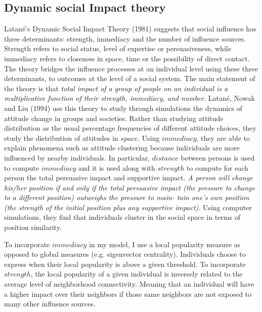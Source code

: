 \documentclass{article}
\begin{document}
\subsection{Dynamic social Impact theory}

Latan\'{e}'s Dynamic Social Impact Theory (1981)\cite{latane81} suggests that social influence has three determinants: strength, immediacy and the number of influence sources. Strength refers to social status, level of expertise or persuasiveness, while immediacy refers to closeness in space, time or the possibility of direct contact. The theory bridges the influence processes at an individual level using these three determinants, to outcomes at the level of a social system. The main statement of the theory is that \textit{total impact of a group of people on an individual is a multiplicative function of their strength, immediacy, and number.} Latan\'{e}, Nowak and Liu (1994)\cite{latane94} use this theory to study through simulations the dynamics of attitude change in groups and societies. Rather than studying attitude distribution as the usual percentage frequencies of different attitude choices, they study the distribution of attitudes in $space$. Using $immediacy$, they are able to explain phenomena such as attitude clustering because individuals are more influenced by nearby individuals. In particular, $distance$ between persons is used to compute $immediacy$ and it is used along with $strength$ to compute for each person the total persuasive impact and supportive impact. \textit{A person will change his/her position if and only if the total persuasive impact (the pressure to change to a different position) outweighs the pressure to main- tain one's own position (the strength of the initial position plus any supportive impact)}. Using computer simulations, they find that individuals cluster in the social space in terms of position similarity. 

To incorporate $immediacy$ in my model, I use a local popularity measure as opposed to global measures (e.g. eigenvector centrality). Individuals choose to express when their local popularity is above a given threshold. To incorporate $strength$, the local popularity of a given individual is inversely related to the average level of neighborhood connectivity. Meaning that an individual will have a higher impact over their neighbors if those same neighbors are not exposed to many other influence sources. %
\end{document}
